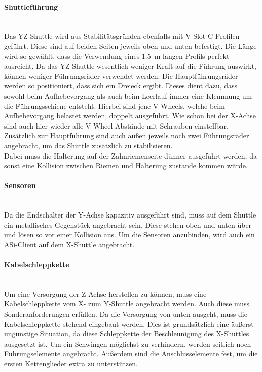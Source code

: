 \paragraph{Shuttleführung}\mbox{}\\
Das YZ-Shuttle wird aus Stabilitätsgründen ebenfalls mit V-Slot C-Profilen geführt. Diese sind auf beiden Seiten jeweils oben und unten befestigt. Die Länge wird so gewählt, dass die Verwendung eines \SI{1.5}{\meter} langen Profils perfekt ausreicht. Da das YZ-Shuttle wesentlich weniger Kraft auf die Führung auswirkt, können weniger Führungsräder verwendet werden. Die Hauptführungsräder werden so positioniert, dass sich ein Dreieck ergibt. Dieses dient dazu, dass sowohl beim Aufhebevorgang als auch beim Leerlauf immer eine Klemmung um die Führungsschiene entsteht. Hierbei sind jene V-Wheels, welche beim Aufhebevorgang belastet werden, doppelt ausgeführt. Wie schon bei der X-Achse sind auch hier wieder alle V-Wheel-Abstände mit Schrauben einstellbar. Zusätzlich zur Hauptführung sind auch außen jeweils noch zwei Führungsräder angebracht, um das Shuttle zusätzlich zu stabilisieren.\\
Dabei muss die Halterung auf der Zahnriemenseite dünner ausgeführt werden, da sonst eine Kollision zwischen Riemen und Halterung zustande kommen würde.

\paragraph{Sensoren}\mbox{}\\
Da die Endschalter der Y-Achse kapazitiv ausgeführt sind, muss auf dem Shuttle ein metallisches Gegenstück angebracht sein. Diese stehen oben und unten über und lösen so vor einer Kollision aus. Um die Sensoren anzubinden, wird auch ein ASi-Client auf dem X-Shuttle angebracht.

\paragraph{Kabelschleppkette}\mbox{}\\
Um eine Versorgung der Z-Achse herstellen zu können, muss eine Kabelschleppkette vom X- zum Y-Shuttle angebracht werden. Auch diese muss Sonderanforderungen erfüllen. Da die Versorgung von unten ausgeht, muss die Kabelschleppkette stehend eingebaut werden. Dies ist grundsätzlich eine äußerst ungünstige Situation, da diese Schleppkette der Beschleunigung des X-Shuttles ausgesetzt ist. Um ein Schwingen möglichst zu verhindern, werden seitlich noch Führungselemente angebracht. Außerdem sind die Anschlusselemente fest, um die ersten Kettenglieder extra zu unterstützen. \cite{igus_vertikal}


